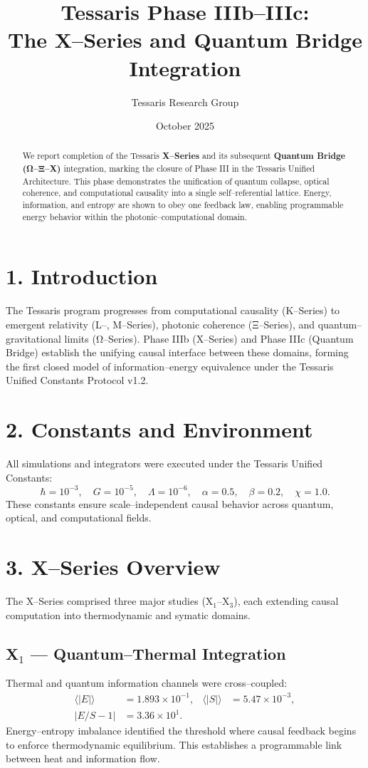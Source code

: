 \documentclass[11pt,a4paper]{article}
\title{\textbf{Tessaris Phase IIIb–IIIc:\\The X–Series and Quantum Bridge Integration}}
\author{Tessaris Research Group}
\date{October 2025}
\begin{document}
\maketitle

\begin{abstract}
We report completion of the Tessaris \textbf{X--Series} and its subsequent \textbf{Quantum Bridge (Ω–Ξ–X)} integration, marking the closure of Phase III in the Tessaris Unified Architecture.  
This phase demonstrates the unification of quantum collapse, optical coherence, and computational causality into a single self--referential lattice.  
Energy, information, and entropy are shown to obey one feedback law, enabling programmable energy behavior within the photonic–computational domain.
\end{abstract}

\section{1. Introduction}
The Tessaris program progresses from computational causality (K–Series) to emergent relativity (L–, M–Series), photonic coherence (Ξ–Series), and quantum–gravitational limits (Ω–Series).  
Phase IIIb (X–Series) and Phase IIIc (Quantum Bridge) establish the unifying causal interface between these domains, forming the first closed model of information–energy equivalence under the Tessaris Unified Constants Protocol v1.2.

\section{2. Constants and Environment}
All simulations and integrators were executed under the Tessaris Unified Constants:
\[
\hbar = 10^{-3}, \quad G = 10^{-5}, \quad \Lambda = 10^{-6}, \quad \alpha = 0.5, \quad \beta = 0.2, \quad \chi = 1.0.
\]
These constants ensure scale--independent causal behavior across quantum, optical, and computational fields.

\section{3. X--Series Overview}
The X–Series comprised three major studies (X$_1$–X$_3$), each extending causal computation into thermodynamic and symatic domains.

\subsection*{X$_1$ — Quantum–Thermal Integration}
Thermal and quantum information channels were cross--coupled:
\begin{align*}
\langle |E| \rangle &= 1.893\times10^{-1}, &
\langle |S| \rangle &= 5.47\times10^{-3},\\
|E/S-1| &= 3.36\times10^{1}. &&
\end{align*}
Energy–entropy imbalance identified the threshold where causal feedback begins to enforce thermodynamic equilibrium.  
This establishes a programmable link between heat and information flow.
\end{document}
